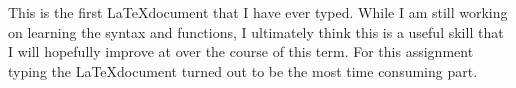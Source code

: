 \documentclass{article}
\begin{document}
This is the first \LaTeX  document that I have ever typed. While I am still working on learning the syntax and functions, I ultimately think this is a useful skill that I will hopefully improve at over the course of this term. For this assignment typing the \LaTeX  document turned out to be the most time consuming part. 
\end{document}
